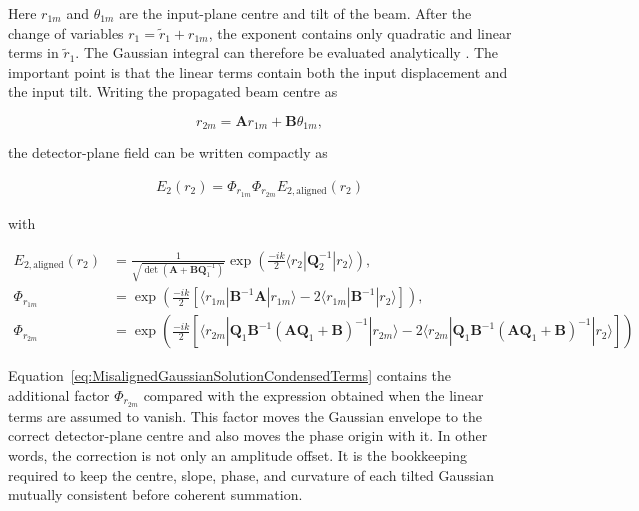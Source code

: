 \documentclass{article}
\begin{document}
Here $r_{1m}$ and $\theta_{1m}$ are the input-plane centre and tilt of the beam. 
After the change of variables $r_1=\tilde{r}_1+r_{1m}$, the exponent contains only quadratic and linear terms in $\tilde{r}_1$. 
The Gaussian integral can therefore be evaluated analytically \cite{siegman_lasers_1986}. 
The important point is that the linear terms contain both the input displacement and the input tilt. 
Writing the propagated beam centre as

\begin{equation}
r_{2m} = \mathbf{A} r_{1m} + \mathbf{B} \theta_{1m},
\label{eq:MisalignedOutputCentre}
\end{equation}

the detector-plane field can be written compactly as

\begin{align}
E_2\left(r_2\right) = 
\Phi_{r_{1m}} \Phi_{r_{2m}} E_{2,\text{aligned}}\left(r_2\right)
\label{eq:MisalignedGaussianSolutionCondensed}
\end{align}

with

\begin{equation}
\begin{aligned}
E_{2,\text{aligned}}\left(r_2\right) &= 
\frac{1}{\sqrt{\det(\mathbf{A} + \mathbf{B} \mathbf{Q}_1^{-1})}}  
\exp\left(\frac{-ik}{2} \langle r_2 | \mathbf{Q}_2^{-1} | r_2 \rangle\right), \\
\Phi_{r_{1m}} &= \exp\left(\frac{-ik}{2} \left[ \langle r_{1m} | \mathbf{B}^{-1}\mathbf{A} | r_{1m} \rangle - 
2 \langle r_{1m} | \mathbf{B}^{-1} | r_2 \rangle \right] \right), \\
\Phi_{r_{2m}} &= \exp\left(\frac{-ik}{2} \left[ \langle r_{2m} | \mathbf{Q}_1 \mathbf{B}^{-1} (\mathbf{A}\mathbf{Q}_1 + \mathbf{B})^{-1} | r_{2m} \rangle 
- 2 \langle r_{2m} | \mathbf{Q}_1 \mathbf{B}^{-1} (\mathbf{A}\mathbf{Q}_1 + \mathbf{B})^{-1} | r_2 \rangle \right] \right)
\end{aligned}
\label{eq:MisalignedGaussianSolutionCondensedTerms}
\end{equation}

Equation~\eqref{eq:MisalignedGaussianSolutionCondensedTerms} contains the additional factor $\Phi_{r_{2m}}$ compared with the expression obtained when the linear terms are assumed to vanish. 
This factor moves the Gaussian envelope to the correct detector-plane centre and also moves the phase origin with it. 
In other words, the correction is not only an amplitude offset. 
It is the bookkeeping required to keep the centre, slope, phase, and curvature of each tilted Gaussian mutually consistent before coherent summation.
\end{document}
